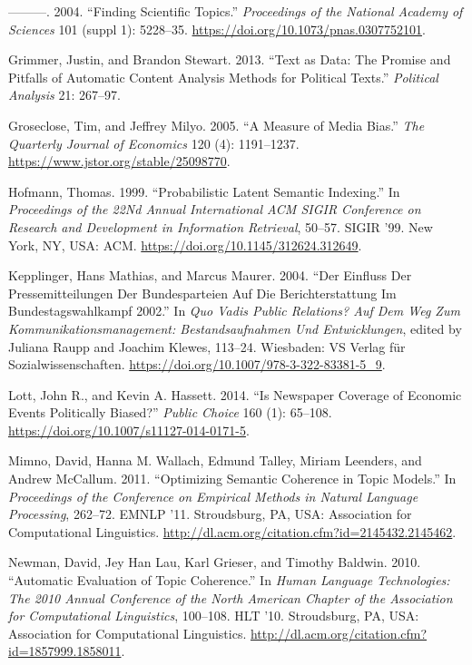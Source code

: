 \documentclass[
]{article}
\begin{document}
\leavevmode\hypertarget{ref-griffiths_finding_2004}{}%
---------. 2004. ``Finding Scientific Topics.'' \emph{Proceedings of the
National Academy of Sciences} 101 (suppl 1): 5228--35.
\url{https://doi.org/10.1073/pnas.0307752101}.

\leavevmode\hypertarget{ref-grimmer_text_2013}{}%
Grimmer, Justin, and Brandon Stewart. 2013. ``Text as Data: The Promise
and Pitfalls of Automatic Content Analysis Methods for Political
Texts.'' \emph{Political Analysis} 21: 267--97.

\leavevmode\hypertarget{ref-groseclose_measure_2005}{}%
Groseclose, Tim, and Jeffrey Milyo. 2005. ``A Measure of Media Bias.''
\emph{The Quarterly Journal of Economics} 120 (4): 1191--1237.
\url{https://www.jstor.org/stable/25098770}.

\leavevmode\hypertarget{ref-hofmann_probabilistic_1999}{}%
Hofmann, Thomas. 1999. ``Probabilistic Latent Semantic Indexing.'' In
\emph{Proceedings of the 22Nd Annual International ACM SIGIR Conference
on Research and Development in Information Retrieval}, 50--57. SIGIR
'99. New York, NY, USA: ACM.
\url{https://doi.org/10.1145/312624.312649}.

\leavevmode\hypertarget{ref-kepplinger_einfluss_2004}{}%
Kepplinger, Hans Mathias, and Marcus Maurer. 2004. ``Der Einfluss Der
Pressemitteilungen Der Bundesparteien Auf Die Berichterstattung Im
Bundestagswahlkampf 2002.'' In \emph{Quo Vadis Public Relations? Auf Dem
Weg Zum Kommunikationsmanagement: Bestandsaufnahmen Und Entwicklungen},
edited by Juliana Raupp and Joachim Klewes, 113--24. Wiesbaden: VS
Verlag für Sozialwissenschaften.
\url{https://doi.org/10.1007/978-3-322-83381-5_9}.

\leavevmode\hypertarget{ref-lott_is_2014}{}%
Lott, John R., and Kevin A. Hassett. 2014. ``Is Newspaper Coverage of
Economic Events Politically Biased?'' \emph{Public Choice} 160 (1):
65--108. \url{https://doi.org/10.1007/s11127-014-0171-5}.

\leavevmode\hypertarget{ref-mimno_optimizing_2011}{}%
Mimno, David, Hanna M. Wallach, Edmund Talley, Miriam Leenders, and
Andrew McCallum. 2011. ``Optimizing Semantic Coherence in Topic
Models.'' In \emph{Proceedings of the Conference on Empirical Methods in
Natural Language Processing}, 262--72. EMNLP '11. Stroudsburg, PA, USA:
Association for Computational Linguistics.
\url{http://dl.acm.org/citation.cfm?id=2145432.2145462}.

\leavevmode\hypertarget{ref-newman_automatic_2010}{}%
Newman, David, Jey Han Lau, Karl Grieser, and Timothy Baldwin. 2010.
``Automatic Evaluation of Topic Coherence.'' In \emph{Human Language
Technologies: The 2010 Annual Conference of the North American Chapter
of the Association for Computational Linguistics}, 100--108. HLT '10.
Stroudsburg, PA, USA: Association for Computational Linguistics.
\url{http://dl.acm.org/citation.cfm?id=1857999.1858011}.
\end{document}
